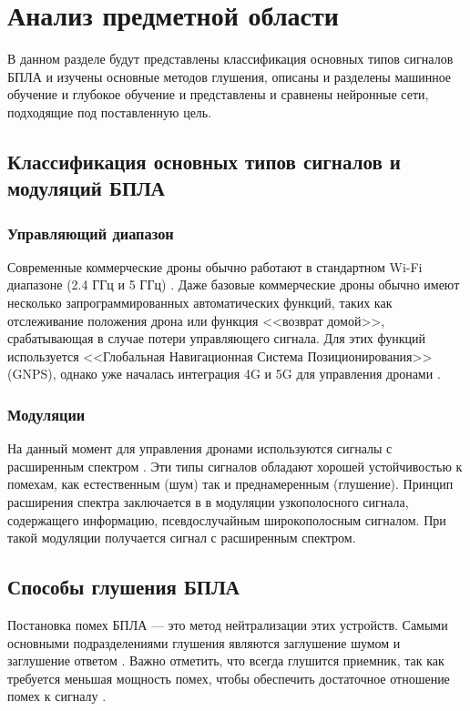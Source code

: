 \chapter{Анализ предметной области}

В данном разделе будут представлены классификация основных типов сигналов БПЛА и изучены основные методов глушения, описаны и разделены машинное обучение и глубокое обучение и представлены и сравнены нейронные сети, подходящие под поставленную цель.

\section{Классификация основных типов сигналов и модуляций БПЛА}

\subsection{Управляющий диапазон}
Современные коммерческие дроны обычно работают в стандартном Wi-Fi диапазоне (2.4 ГГц и 5 ГГц) \cite{wifidiapazon}. Даже базовые коммерческие дроны обычно имеют несколько запрограммированных автоматических функций, таких как отслеживание положения дрона или функция <<возврат домой>>, срабатывающая в случае потери управляющего сигнала. Для этих функций используется <<Глобальная Навигационная Система Позиционирования>> (GNPS), однако уже началась интеграция 4G и 5G для управления дронами \cite{4gand5g}.

\subsection{Модуляции}

На данный момент для управления дронами используются сигналы с расширенным спектром \cite{spreadspecsignals}. Эти типы сигналов обладают хорошей устойчивостью к помехам, как естественным (шум) так и преднамеренным (глушение). Принцип расширения спектра заключается в в модуляции \cite{signalmodulation} узкополосного сигнала, содержащего информацию, псевдослучайным широкополосным сигналом. При такой модуляции получается сигнал с расширенным спектром.

\section{Способы глушения БПЛА}

Постановка помех БПЛА --- это метод нейтрализации этих устройств. Самыми основными подразделениями глушения являются заглушение шумом и заглушение ответом \cite{radioelecpomeh}. Важно отметить, что всегда глушится приемник, так как требуется меньшая мощность помех, чтобы обеспечить достаточное отношение помех к сигналу \cite{signaltointer}.


